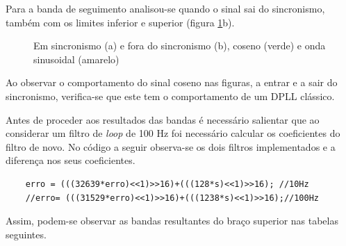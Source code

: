 \documentclass[11pt]{article}
\numberwithin{equation}{section}
\begin{document}
Para a banda de seguimento analisou-se quando o sinal sai do sincronismo, também com os limites inferior e superior (figura \ref{cap_segue}b).
\begin{figure}[h]
	\centering
	\hspace{6 mm}
	\caption{Em sincronismo (a) e fora do sincronismo (b), coseno (verde) e onda sinusoidal (amarelo)}
	\label{cap_segue}
\end{figure}

Ao observar o comportamento do sinal coseno nas figuras, a entrar e a sair do sincronismo, verifica-se que este tem o comportamento de um DPLL clássico.

Antes de proceder aos resultados das bandas é necessário salientar que ao considerar um filtro de \textit{loop} de 100 Hz foi necessário calcular os coeficientes do filtro de novo. No código a seguir observa-se os dois filtros implementados e a diferença nos seus coeficientes. 
\begin{lstlisting}
	erro = (((32639*erro)<<1)>>16)+(((128*s)<<1)>>16); //10Hz
	//erro= (((31529*erro)<<1)>>16)+(((1238*s)<<1)>>16);//100Hz
\end{lstlisting}

Assim, podem-se observar as bandas resultantes do braço superior nas tabelas seguintes.
\begin{figure}[H]
	\centering
	\hspace{6 mm}
\end{figure}
\end{document}
